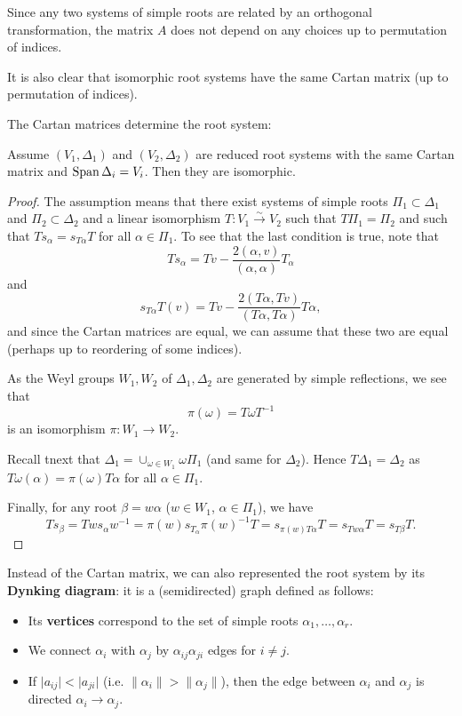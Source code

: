 \documentclass[11pt, english]{article}
\begin{document}
Since any two systems of simple roots are related by an orthogonal transformation, the matrix $A$ does not depend on any choices up to permutation of indices.

It is also clear that isomorphic root systems have the same Cartan matrix (up to permutation of indices). 

The Cartan matrices determine the root system:

\begin{prop}
  Assume $(V_1,\Delta_1)$ and $(V_2,\Delta_2)$ are reduced root systems with the same Cartan matrix and $\operatorname{Span} \Delta_i=V_i$. Then they are isomorphic.
\end{prop}

\begin{proof}
 The assumption means that there exist systems of simple roots $\Pi_1 \subset \Delta_1$ and $\Pi_2 \subset \Delta_2$ and a linear isomorphism $T:V_1 \xrightarrow{\sim} V_2$ such that $T \Pi_1 = \Pi_2$ and such that $Ts_\alpha = s_{T \alpha} T$ for all $\alpha \in \Pi_1$. To see that the last condition is true, note that
$$
Ts_\alpha = Tv  -\frac{2(\alpha,v)}{(\alpha, \alpha)} T_\alpha
$$
and
$$
s_{T\alpha}T(v) = Tv - \frac{2(T\alpha,Tv)}{(T\alpha,T\alpha)} T\alpha,
$$
and since the Cartan matrices are equal, we can assume that these two are equal (perhaps up to reordering of some indices). 

As the Weyl groups $W_1, W_2$ of $\Delta_1, \Delta_2$ are generated by simple reflections, we see that 
$$
\pi(\omega ) = T \omega T^{-1}
$$
is an isomorphism $\pi:W_1 \to W_2$. 

Recall tnext that $\Delta_1 = \cup_{\omega \in W_1} \omega \Pi_1$ (and same for $\Delta_2$). Hence $T \Delta_1 = \Delta_2$ as $T\omega (\alpha) = \pi(\omega)T\alpha$ for all $\alpha \in \Pi_1$.

Finally, for any root $\beta=w\alpha$ ($w \in W_1$, $\alpha \in \Pi_1$), we have
$$
T  s_\beta = Tw s_\alpha w^{-1} = \pi(w) s_{T_\alpha} \pi(w)^{-1} T = s_{\pi(w)T\alpha} T = s_{Tw \alpha} T = s_{T\beta} T.
$$
\end{proof}

Instead of the Cartan matrix, we can also represented the root system by its \textbf{Dynking diagram}: it is a (semidirected) graph defined as follows:

\begin{itemize}
\item Its \textbf{vertices} correspond to the set of simple roots $\alpha_1,\ldots,\alpha_r$. 
\item We connect $\alpha_i$ with $\alpha_j$ by $\alpha_{ij}\alpha_{ji}$ edges for $i \neq j$. 
\item If $\lvert a_{ij} \rvert < \lvert a_{ji} \rvert$ (i.e. $\| \alpha_i  \| > \| \alpha_j \|$), then the edge between $\alpha_i$ and $\alpha_j$ is directed $\alpha_i \to \alpha_j$.
\end{itemize}
\end{document}
